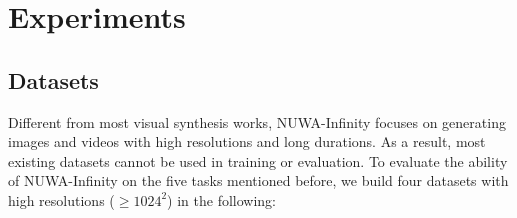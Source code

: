 \documentclass{article}
\begin{document}


\section{Experiments}
\vspace{-2mm}
\subsection{Datasets}
\vspace{-2mm}
Different from most visual synthesis works, NUWA-Infinity focuses on generating images and videos with high resolutions and long durations. As a result, most existing datasets cannot be used in training or evaluation. To evaluate the ability of NUWA-Infinity on the five tasks mentioned before, we build four datasets with high resolutions ($\geqslant 1024^{2}$) in the following:
\end{document}
